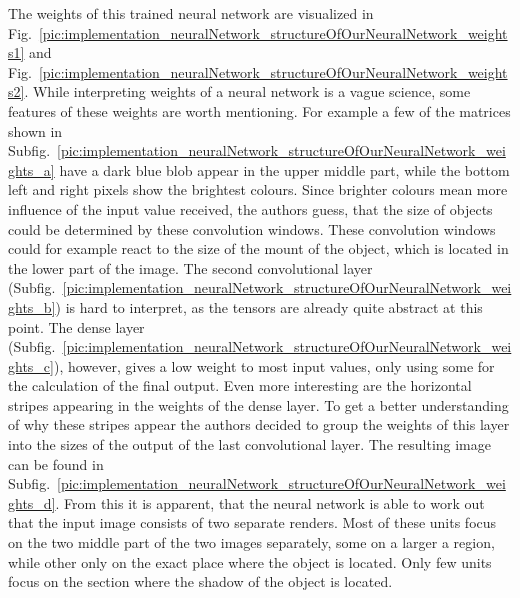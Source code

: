 The weights of this trained neural network are visualized in Fig.~\ref{pic:implementation_neuralNetwork_structureOfOurNeuralNetwork_weights1} and Fig.~\ref{pic:implementation_neuralNetwork_structureOfOurNeuralNetwork_weights2}. While interpreting weights of a neural network is a vague science, some features of these weights are worth mentioning. For example a few of the matrices shown in Subfig.~\ref{pic:implementation_neuralNetwork_structureOfOurNeuralNetwork_weights_a} have a dark blue blob appear in the upper middle part, while the bottom left and right pixels show the brightest colours. Since brighter colours mean more influence of the input value received, the authors guess, that the size of objects could be determined by these convolution windows. These convolution windows could for example react to the size of the mount of the object, which is located in the lower part of the image. The second convolutional layer (Subfig.~\ref{pic:implementation_neuralNetwork_structureOfOurNeuralNetwork_weights_b}) is hard to interpret, as the tensors are already quite abstract at this point. The dense layer (Subfig.~\ref{pic:implementation_neuralNetwork_structureOfOurNeuralNetwork_weights_c}), however, gives a low weight to most input values, only using some for the calculation of the final output. Even more interesting are the horizontal stripes appearing in the weights of the dense layer. To get a better understanding of why these stripes appear the authors decided to group the weights of this layer into the sizes of the output of the last convolutional layer. The resulting image can be found in Subfig.~\ref{pic:implementation_neuralNetwork_structureOfOurNeuralNetwork_weights_d}. From this it is apparent, that the neural network is able to work out that the input image consists of two separate renders. Most of these units focus on the two middle part of the two images separately, some on a larger a region, while other only on the exact place where the object is located. Only few units focus on the section where the shadow of the object is located.

\newpage

